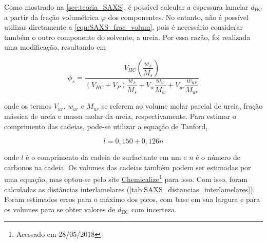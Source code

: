 	Como mostrado na \autoref{sec:teoria_SAXS}, é possível calcular a espessura lamelar \(d_\mathrm{HC}\) a partir da fração volumétrica \(\varphi\) dos componentes. No entanto, não é possível utilizar diretamente a \autoref{eqn:SAXS_frac_volum}, pois é necessário considerar também o outro componente do solvente, a ureia. Por essa razão, foi realizada uma modificação, resultando em
	
	\begin{equation}
		\phi_s = \dfrac{V_{\textit{HC}}\left( \dfrac{w_{s}}{M_{s}} \right)}{\left( V_{\textit{HC}} + V_{P} \right)\dfrac{w_{s}}{M_{s}} + V_{w}\dfrac{w_{w}}{M_{w}} + V_{\textit{ur}}\dfrac{w_{\textit{ur}}}{M_{\textit{ur}}}}
		\label{eqn:SAXS_frac_volum_com_ureia}
	\end{equation} 

	\noindent onde os termos \(V_{\textit{ur}}\), \(w_{\textit{ur}}\) e \(M_{\textit{ur}}\)	se referem ao volume molar parcial de ureia, fração mássica de ureia e massa molar da ureia, respectivamente. Para estimar o comprimento das cadeias, pode-se utilizar a equação de Tanford,\cite{Israelachvili2011}
	
	\begin{equation}
		l = 0{,}150 + 0{,}126n
		\label{eqn:tanford}
	\end{equation}
	
	\noindent onde \(l\) é o comprimento da cadeia de surfactante em nm e \(n\) é o número de carbonos na cadeia. Os volumes das cadeias também podem ser estimadas por uma equação, mas optou-se pelo site \href{www.chemicalize.com}{Chemicalize}\footnote{Acessado em 28/05/2018} para isso. Com isso, foram calculadas as distâncias interlamelares (\autoref{tab:SAXS_distancias_interlamelares}). Foram estimados erros para o máximo dos picos, com base em sua largura e para os volumes para se obter valores de \(d_\mathrm{HC}\) com incerteza.  
	

